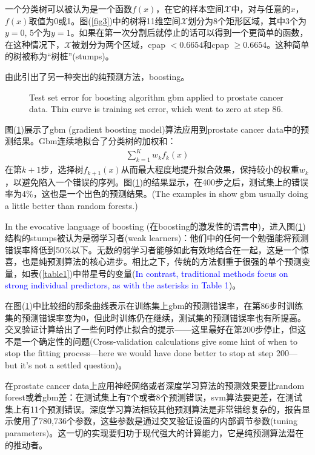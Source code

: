 \documentclass[lang=cn,11pt,a4paper,cite=authoryear]{elegantpaper}
\begin{document}
一个分类树可以被认为是一个函数$f(x)$，在它的样本空间$\mathcal{X}$中，对与任意的$x$，$f(x)$取值为0或1。图(\ref{fig3})中的树将11维空间$\mathcal{X}$划分为8个矩形区域，其中3个为$y=0$, 5个为$y=1$。如果在第一次分割后就停止的话可以得到一个更简单的函数，在这种情况下，$\mathcal{X}$被划分为两个区域，cpap $<0.6654$和cpap $\geq 0.6654$。这种简单的树被称为“树桩”(stumps)。

由此引出了另一种突出的纯预测方法，boosting。
\begin{figure}[H]
		\centering
		\caption{Test set error for boosting algorithm gbm applied to prostate cancer data. Thin curve is training set error, which went to zero at step 86.}
		\label{fig6}
\end{figure}
图(\ref{fig6})展示了gbm (gradient boosting model)算法应用到prostate cancer data中的预测结果。Gbm连续地拟合了分类树的加权和：
\begin{align}
\sum_{k=1}^{K} w_{k} f_{k}(x)
\end{align}
在第$k+1$步，选择树$f_{k+1}(x)$从而最大程度地提升拟合效果，保持较小的权重$w_k$，以避免陷入一个错误的序列。图(\ref{fig6})的结果显示，在400步之后，测试集上的错误率为4\%，这也是一个出色的预测结果。(The examples in \cite{hastie2009elements} show gbm usually doing a little better than random forests.)

In the evocative language of boosting (在boosting的激发性的语言中)，进入图(\ref{fig6})结构的stumps被认为是弱学习者(weak learners)：他们中的任何一个勉强能将预测错误率降低到50\%以下。无数的弱学习者能够如此有效地结合在一起，这是一个惊喜，也是纯预测算法的核心进步。相比之下，传统的方法侧重于很强的单个预测变量，如表(\ref{table1})中带星号的变量(\textcolor{blue}{In contrast, traditional methods focus on strong individual predictors, as with the asterisks in Table 1})。

在图(\ref{fig6})中比较细的那条曲线表示在训练集上gbm的预测错误率，在第86步时训练集的预测错误率变为0，但此时训练仍在继续，测试集的预测错误率也有所提高。交叉验证计算给出了一些何时停止拟合的提示——这里最好在第200步停止，但这不是一个确定性的问题(Cross-validation calculations give some hint of when to stop the fitting process—here we would have done better to stop at step 200—but it's not a settled question)。

在prostate cancer data上应用神经网络或者深度学习算法的预测效果要比random forest或着gbm差：在测试集上有7个或者8个预测错误，svm算法要更差，在测试集上有11个预测错误。深度学习算法相较其他预测算法是非常错综复杂的，报告显示使用了780,736个参数，这些参数是通过交叉验证设置的内部调节参数(tuning parameters)。这一切的实现要归功于现代强大的计算能力，它是纯预测算法潜在的推动者。
\end{document}
